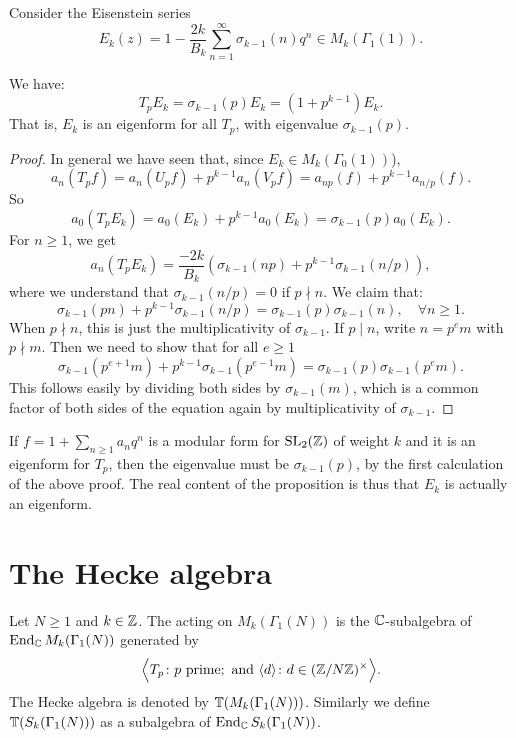 \begin{example}
  Consider the Eisenstein series
\[
E_k(z)=1-\frac{2k}{B_k}\sum_{n=1}^\infty \sigma_{k-1}(n)q^n\in M_k(\Gamma_1(1)).
\]
\begin{proposition}
  \label{prop:Ek-is-eigen}
We have:
\[
T_p E_k = \sigma_{k-1}(p) E_k = (1+p^{k-1})E_k.
\]
That is, $E_k$ is an eigenform for all $T_p$, with eigenvalue $\sigma_{k-1}(p)$.
\end{proposition}
\begin{proof}
 In general we have seen that, since $E_k\in M_k(\Gamma_0(1))$),
\[
a_n(T_pf)= a_n(U_p f) + p^{k-1} a_n(V_p f) = a_{np}(f)+p^{k-1} a_{n/p}(f).
\]
So
\[
a_0(T_pE_k) = a_0(E_k) + p^{k-1} a_0(E_k) = \sigma_{k-1}(p) a_0(E_k).
\]
For $n\geq 1$, we get
\[
a_n(T_pE_k) = \frac{-2k}{B_k}\left(\sigma_{k-1}(np)+p^{k-1}\sigma_{k-1}(n/p)\right),
\]
where we understand that $\sigma_{k-1}(n/p)=0$ if $p\nmid n$. We claim that:
\[
\sigma_{k-1}(pn) + p^{k-1}\sigma_{k-1}(n/p) = \sigma_{k-1}(p)\sigma_{k-1}(n),\quad \forall n\geq 1.
\]
When $p\nmid n$, this is just the multiplicativity of $\sigma_{k-1}$. If $p\mid n$, write $n=p^em$ with $p\nmid m$. Then we need to show that for all $e\geq 1$
\[
\sigma_{k-1}(p^{e+1}m) + p^{k-1}\sigma_{k-1}(p^{e-1}m) = \sigma_{k-1}(p)\sigma_{k-1}(p^em).
\]
This follows easily by dividing both sides by $\sigma_{k-1}(m)$, which is a common factor of both sides of the equation again by multiplicativity of $\sigma_{k-1}$.
\end{proof}
\begin{remark}
  If $f=1+\sum_{n\geq 1} a_n q^n$ is a modular form for $\operatorname{SL}_2(\mathbb{Z})$ of weight $k$ and it is an eigenform for $T_p$, then the eigenvalue must be $\sigma_{k-1}(p)$, by the first calculation of the above proof. The real content of the proposition is thus that $E_k$ is actually an eigenform.
\end{remark}
\end{example}
\section{The Hecke algebra}
\begin{definition}
  Let $N\geq 1$ and $k\in \mathbb{Z}$. The  acting on $M_k(\Gamma_1(N))$ is the $\mathbb{C}$-subalgebra of $\operatorname{End}_{\mathbb{C}} M_k(\Gamma_1(N))$ generated by
\[
\Big\langle T_p\colon p\text{ prime};\text{ and } \langle d\rangle \colon d\in (\mathbb{Z}/N\mathbb{Z})^\times\Big\rangle.
\]
The Hecke algebra is denoted by $\mathbb{T}(M_k(\Gamma_1(N)))$. Similarly we define $\mathbb{T}(S_k(\Gamma_1(N)))$ as a subalgebra of $\operatorname{End}_{\mathbb{C}} S_k(\Gamma_1(N))$.
\end{definition}

